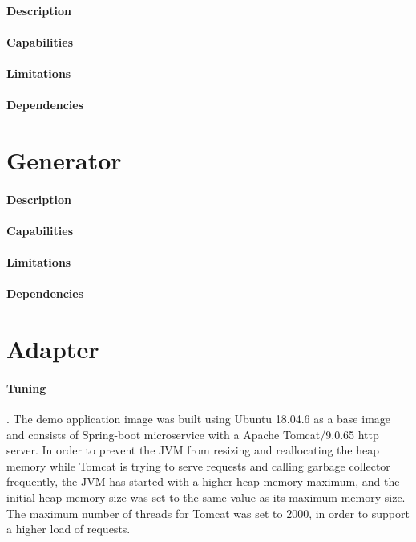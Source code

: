 \paragraph{Description}
\paragraph{Capabilities}
\paragraph{Limitations}
\paragraph{Dependencies}

\section{Generator} %
\label{sec:generator}

\paragraph{Description}
\paragraph{Capabilities}
\paragraph{Limitations}
\paragraph{Dependencies}

\section{Adapter} %
\label{sec:adapter}

\paragraph{Tuning}. The demo application image was built using Ubuntu 18.04.6 as a base image and consists of Spring-boot microservice with a Apache Tomcat/9.0.65 http server.
In order to prevent the JVM from resizing and reallocating the heap memory while Tomcat is trying to serve requests and
calling garbage collector frequently, the JVM has started with a higher heap memory maximum, and the initial heap memory
size was set to the same value as its maximum memory size.
The maximum number of threads for Tomcat was set to 2000, in order to support a higher load of requests.

